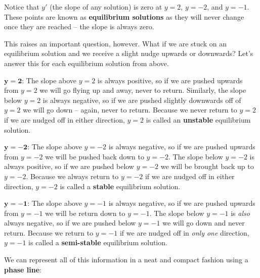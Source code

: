 Notice that $y'$ (the slope of any solution) is zero at $y = 2$, $y = -2$, and $y = -1$. These points are known as \textbf{equilibrium solutions} as they will never change once they are reached – the slope is always zero.

This raises an important question, however. What if we are stuck on an equilibrium solution and we receive a slight nudge upwards or downwards? Let's answer this for each equilibrium solution from above.

$\bm{y = 2}$: The slope above $y = 2$ is always positive, so if we are pushed upwards from $y = 2$ we will go flying up and away, never to return. Similarly, the slope below $y = 2$ is always negative, so if we are pushed slightly downwards off of $y = 2$ we will go down – again, never to return. Because we never return to $y = 2$ if we are nudged off in either direction, $y = 2$ is called an \textbf{unstable} equilibrium solution.

\pagebreak

$\bm{y = -2}$: The slope above $y = -2$ is always negative, so if we are pushed upwards from $y = -2$ we will be pushed back down to $y = -2$. The slope below $y = -2$ is always positive, so if we are pushed below $y = -2$ we will be brought back up to $y = -2$. Because we always return to $y = -2$ if we are nudged off in either direction, $y = -2$ is called a \textbf{stable} equilibrium solution.

$\bm{y = -1}$: The slope above $y = -1$ is always negative, so if we are pushed upwards from $y = -1$ we will be return down to $y = -1$. The slope below $y = -1$ is \textit{also} always negative, so if we are pushed below $y = -1$ we will go down and never return. Because we return to $y = -1$ if we are nudged off in \textit{only one} direction, $y = -1$ is called a \textbf{semi-stable} equilibrium solution.

We can represent all of this information in a neat and compact fashion using a \textbf{phase line}:

